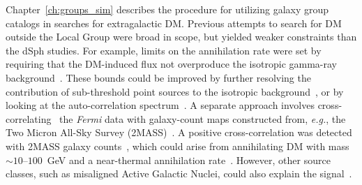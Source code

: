 Chapter~\ref{ch:groups_sim} describes the procedure for utilizing  galaxy group catalogs in searches for extragalactic DM.  Previous attempts to search for DM outside the Local Group were broad in scope, but yielded weaker constraints than the dSph studies.  For example, limits on the annihilation rate were set by requiring that the DM-induced flux not overproduce the isotropic gamma-ray background~\cite{Ackermann:2015tah}.  These bounds could be improved by further resolving the contribution of sub-threshold point sources to the isotropic background~\cite{Zechlin:2016pme,Lisanti:2016jub}, or by  
looking at the auto-correlation spectrum~\cite{Ackermann:2012uf, Ackermann:2012uf,Ando:2006cr,Ando:2013ff}.  A separate approach involves cross-correlating~\cite{Xia:2011ax,Ando:2014aoa,Ando:2013xwa,Xia:2015wka,Regis:2015zka,Cuoco:2015rfa,Ando:2016ang} the {\it Fermi} data with galaxy-count maps constructed from, \emph{e.g.}, the Two Micron All-Sky Survey (2MASS)~\cite{Jarrett:2000me,Bilicki:2013sza}.  A positive cross-correlation was detected with 2MASS galaxy counts~\cite{Xia:2015wka}, which could arise from annihilating DM with mass $\sim$$10$--$100$~GeV and a near-thermal annihilation rate~\cite{Regis:2015zka}.  However, other source classes, such as misaligned Active Galactic Nuclei, could also explain the signal~\cite{Cuoco:2015rfa}.
  
